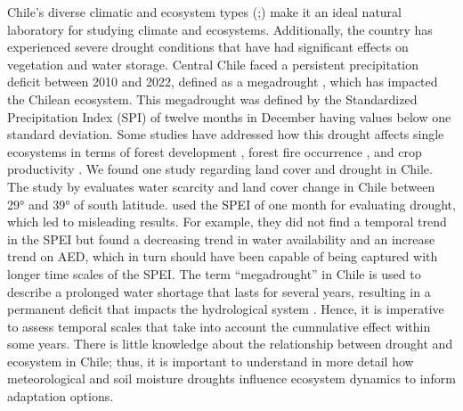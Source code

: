 \documentclass[
  authoryear,
  preprint,
  3p,
  onecolumn]{elsarticle}
\begin{document}
Chile's diverse climatic and ecosystem types
(\citet{Beck2023};\citet{Luebert2022}) make it an ideal natural
laboratory for studying climate and ecosystems. Additionally, the
country has experienced severe drought conditions that have had
significant effects on vegetation and water storage. Central Chile faced
a persistent precipitation deficit between 2010 and 2022, defined as a
megadrought \citep{Garreaud2017}, which has impacted the Chilean
ecosystem. This megadrought was defined by the Standardized
Precipitation Index (SPI) of twelve months in December having values
below one standard deviation. Some studies have addressed how this
drought affects single ecosystems in terms of forest development
\citep{Miranda2020, Venegas2018}, forest fire occurrence
\citep{UrrutiaJalabert2018}, and crop productivity
\citep{Zambrano2023, Zambrano2018, Zambrano2016}. We found one study
regarding land cover and drought in Chile. The study by
\citet{Fuentes2021} evaluates water scarcity and land cover change in
Chile between 29° and 39° of south latitude. \citet{Fuentes2021} used
the SPEI of one month for evaluating drought, which led to misleading
results. For example, they did not find a temporal trend in the SPEI but
found a decreasing trend in water availability and an increase trend on
AED, which in turn should have been capable of being captured with
longer time scales of the SPEI. The term ``megadrought'' in Chile is
used to describe a prolonged water shortage that lasts for several
years, resulting in a permanent deficit that impacts the hydrological
system \citep{Boisier2018}. Hence, it is imperative to assess temporal
scales that take into account the cumnulative effect within some years.
There is little knowledge about the relationship between drought and
ecosystem in Chile; thus, it is important to understand in more detail
how meteorological and soil moisture droughts influence ecosystem
dynamics to inform adaptation options.
\end{document}

